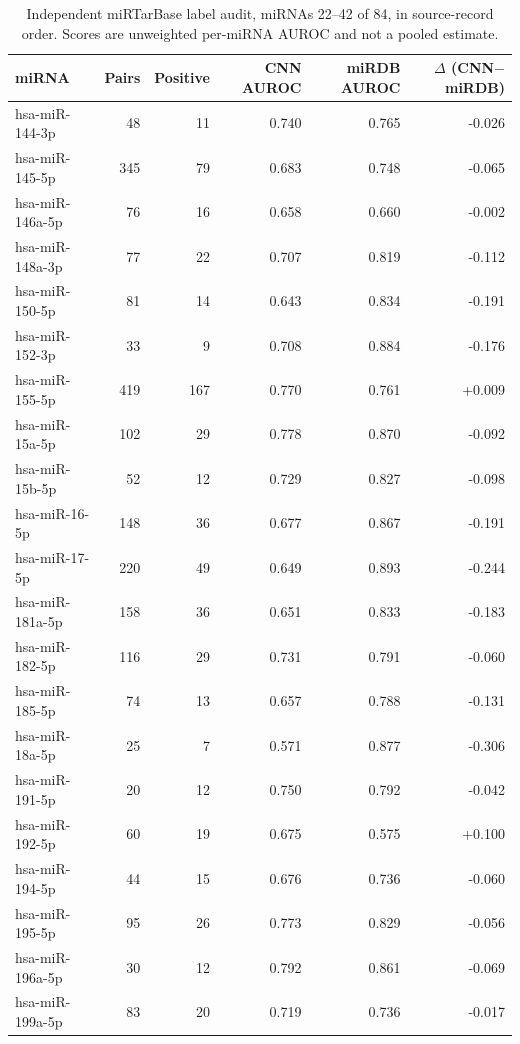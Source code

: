 \begin{table}[htbp]\centering\scriptsize
\begin{tabular}{lrrrrr}\hline
miRNA & Pairs & Positive & CNN AUROC & miRDB AUROC & $\Delta$ (CNN$-$miRDB) \\ \hline
hsa-miR-144-3p & 48 & 11 & 0.740 & 0.765 & -0.026 \\
hsa-miR-145-5p & 345 & 79 & 0.683 & 0.748 & -0.065 \\
hsa-miR-146a-5p & 76 & 16 & 0.658 & 0.660 & -0.002 \\
hsa-miR-148a-3p & 77 & 22 & 0.707 & 0.819 & -0.112 \\
hsa-miR-150-5p & 81 & 14 & 0.643 & 0.834 & -0.191 \\
hsa-miR-152-3p & 33 & 9 & 0.708 & 0.884 & -0.176 \\
hsa-miR-155-5p & 419 & 167 & 0.770 & 0.761 & +0.009 \\
hsa-miR-15a-5p & 102 & 29 & 0.778 & 0.870 & -0.092 \\
hsa-miR-15b-5p & 52 & 12 & 0.729 & 0.827 & -0.098 \\
hsa-miR-16-5p & 148 & 36 & 0.677 & 0.867 & -0.191 \\
hsa-miR-17-5p & 220 & 49 & 0.649 & 0.893 & -0.244 \\
hsa-miR-181a-5p & 158 & 36 & 0.651 & 0.833 & -0.183 \\
hsa-miR-182-5p & 116 & 29 & 0.731 & 0.791 & -0.060 \\
hsa-miR-185-5p & 74 & 13 & 0.657 & 0.788 & -0.131 \\
hsa-miR-18a-5p & 25 & 7 & 0.571 & 0.877 & -0.306 \\
hsa-miR-191-5p & 20 & 12 & 0.750 & 0.792 & -0.042 \\
hsa-miR-192-5p & 60 & 19 & 0.675 & 0.575 & +0.100 \\
hsa-miR-194-5p & 44 & 15 & 0.676 & 0.736 & -0.060 \\
hsa-miR-195-5p & 95 & 26 & 0.773 & 0.829 & -0.056 \\
hsa-miR-196a-5p & 30 & 12 & 0.792 & 0.861 & -0.069 \\
hsa-miR-199a-5p & 83 & 20 & 0.719 & 0.736 & -0.017 \\
\hline\end{tabular}
\caption{Independent miRTarBase label audit, miRNAs 22--42 of 84, in source-record order. Scores are unweighted per-miRNA AUROC and not a pooled estimate.}\label{tab:mirna-audit-2}
\end{table}
